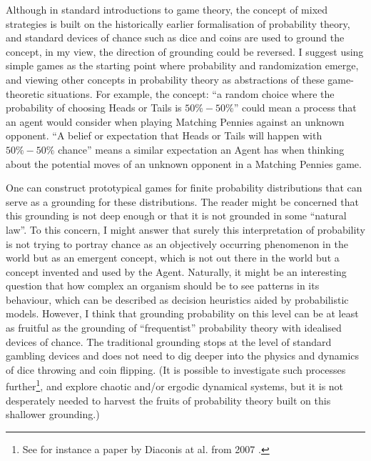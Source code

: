 \documentclass{article}
\begin{document}
Although in standard introductions to game theory, the concept of mixed strategies is built on the historically earlier formalisation of probability theory, and standard devices of chance such as dice and coins are used to ground the concept, in my view, the direction of grounding could be reversed.
I suggest using simple games as the starting point where probability and randomization emerge, and viewing other concepts in probability theory as abstractions of these game-theoretic situations.
For example, the concept: ``a random choice where the probability of choosing Heads or Tails is $50\%-50\%$'' could mean a process that an agent would consider when playing Matching Pennies against an unknown opponent. ``A belief or expectation that Heads or Tails will happen with $50\%-50\%$ chance'' means a similar expectation an Agent has when thinking about the potential moves of an unknown opponent in a Matching Pennies game.

One can construct prototypical games for finite probability distributions that can serve as a grounding for these distributions.
The reader might be concerned that this grounding is not deep enough or that it is not grounded in some ``natural law''. To this concern, I might answer that surely this interpretation of probability is not trying to portray chance as an objectively occurring phenomenon in the world but as an emergent concept, which is not out there in the world but a concept invented and used by the Agent.
Naturally, it might be an interesting question that how complex an organism should be to see patterns in its behaviour, which can be described as decision heuristics aided by probabilistic models.
However, I think that grounding probability on this level can be at least as fruitful as the grounding of ``frequentist'' probability theory with idealised devices of chance. The traditional grounding stops at the level of standard gambling devices and does not need to dig deeper into the physics and dynamics of dice throwing and coin flipping. (It is possible to investigate such processes further\footnote{See for instance a paper by Diaconis at al. from 2007 \cite{paper:Diaconis2007}.}, and explore chaotic and/or ergodic dynamical systems, but it is not desperately needed to harvest the fruits of probability theory built on this shallower grounding.)
\end{document}
